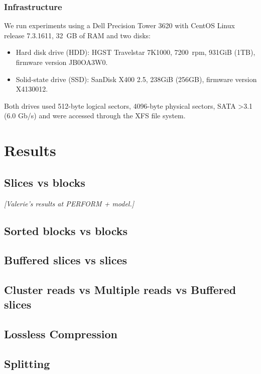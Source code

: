 \documentclass[10pt, conference, compsocconf]{IEEEtran}
\newcommand{\todo}[1]{
  \color{red}\emph{[#1]}
  \color{black}
}
\begin{document}
\subsubsection{Infrastructure}

We run experiments using a Dell Precision Tower 3620 with CentOS Linux release
7.3.1611, 32~GB of RAM and two disks:
\begin{itemize}
  \item Hard disk drive (HDD): HGST Travelstar 7K1000, 7200~rpm, 931GiB (1TB), firmware version JB0OA3W0.
    \item Solid-state drive (SSD): SanDisk X400 2.5, 238GiB (256GB),
      firmware version X4130012.
\end{itemize}
Both drives used 512-byte logical sectors, 4096-byte physical sectors,
SATA >3.1 (6.0 Gb/s) and were accessed through the XFS file system.

\section{Results}
\label{sec:results}

\subsection{Slices vs blocks}

\todo{Valerie's results at PERFORM + model.}

\subsection{Sorted blocks vs blocks}

\subsection{Buffered slices vs slices}


\subsection{Cluster reads vs Multiple reads vs Buffered slices}


\subsection{Lossless Compression}

\subsection{Splitting}
\end{document}
